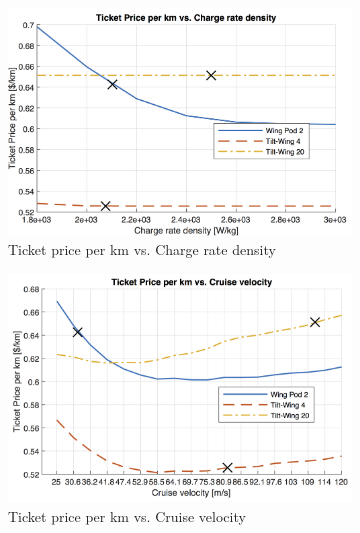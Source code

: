 \begin{figure}[h]
\begin{subfigure}[t]{0.33\textwidth}
    \centering
    \includegraphics[width=\textwidth]{Figures/CRate_TPrice_perkmNOPAD.png}
    \captionsetup{justification=centering}
    \caption{Ticket price per km vs. Charge rate density}
    \label{fig:sens7}
\end{subfigure}
\begin{subfigure}[t]{0.33\textwidth}
    \centering
    \includegraphics[width=\textwidth]{Figures/Cruise_TPrice_perkmNOPAD.png}
    \captionsetup{justification=centering}
    \caption{Ticket price per km vs. Cruise velocity}
    \label{fig:sens8}
\end{subfigure}
\begin{subfigure}[t]{0.33\textwidth}
    \centering

\end{subfigure}
\end{figure}
